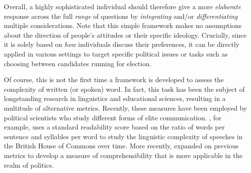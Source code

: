 Overall, a highly sophisticated individual should therefore give a more \textit{elaborate} response across the full \textit{range} of questions by \textit{integrating} and/or \textit{differentiating} multiple considerations. Note that this simple framework makes no assumptions about the direction of people's attitudes or their specific ideology. Crucially, since it is solely based on \textit{how} individuals discuss their preferences, it can be directly applied in various settings to target specific political issues or tasks such as choosing between candidates running for election.

Of course, this is not the first time a framework is developed to assess the complexity of written (or spoken) word. In fact, this task has been the subject of longstanding research in linguistics and educational sciences, resulting in a multitude of alternative metrics. Recently, these measures have been employed by political scientists who study different forms of elite communication. \citet{spirling2016democratization}, for example, uses a standard readability score based on the ratio of words per sentence and syllables per word to study the linguistic complexity of speeches in the British House of Commons over time. More recently, \citet{benoit2019measuring} expanded on previous metrics to develop a measure of comprehensibility that is more applicable in the realm of politics.

